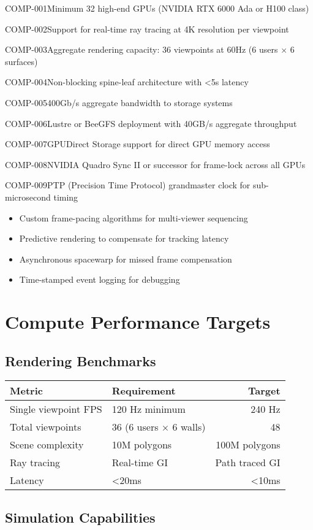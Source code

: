 \begin{requirement}{COMP-001}{Minimum 32 high-end GPUs (NVIDIA RTX 6000 Ada or H100 class)}
\begin{requirement}{COMP-002}{Support for real-time ray tracing at 4K resolution per viewpoint}
\begin{requirement}{COMP-003}{Aggregate rendering capacity: 36 viewpoints at 60Hz (6 users × 6 surfaces)}
\begin{requirement}{COMP-004}{Non-blocking spine-leaf architecture with <5\textmu s latency}
\begin{requirement}{COMP-005}{400Gb/s aggregate bandwidth to storage systems}
\begin{requirement}{COMP-006}{Lustre or BeeGFS deployment with 40GB/s aggregate throughput}
\begin{requirement}{COMP-007}{GPUDirect Storage support for direct GPU memory access}
\begin{requirement}{COMP-008}{NVIDIA Quadro Sync II or successor for frame-lock across all GPUs}
\begin{requirement}{COMP-009}{PTP (Precision Time Protocol) grandmaster clock for sub-microsecond timing}
\begin{itemize}
    \item Custom frame-pacing algorithms for multi-viewer sequencing
    \item Predictive rendering to compensate for tracking latency
    \item Asynchronous spacewarp for missed frame compensation
    \item Time-stamped event logging for debugging
\end{itemize}

\section{Compute Performance Targets}

\subsection{Rendering Benchmarks}

\begin{table}[H]
\centering
\begin{tabularx}{\textwidth}{@{}lXr@{}}
\toprule
\textbf{Metric} & \textbf{Requirement} & \textbf{Target} \\
\midrule
Single viewpoint FPS & 120 Hz minimum & 240 Hz \\
Total viewpoints & 36 (6 users × 6 walls) & 48 \\
Scene complexity & 10M polygons & 100M polygons \\
Ray tracing & Real-time GI & Path traced GI \\
Latency & <20ms & <10ms \\
\bottomrule
\end{tabularx}
\end{table}

\subsection{Simulation Capabilities}


\end{requirement}
\end{requirement}
\end{requirement}
\end{requirement}
\end{requirement}
\end{requirement}
\end{requirement}
\end{requirement}
\end{requirement}
